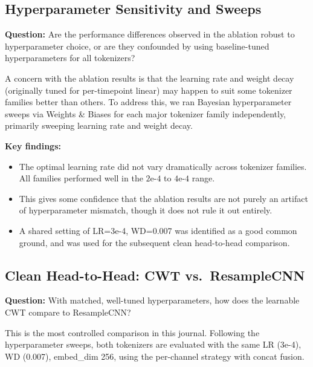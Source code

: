 \documentclass[11pt, a4paper]{article}
\begin{document}
\subsection{Hyperparameter Sensitivity and Sweeps}
\label{sec:hp-sweeps}

\textbf{Question:} Are the performance differences observed in the
ablation robust to hyperparameter choice, or are they confounded by
using baseline-tuned hyperparameters for all tokenizers?

A concern with the ablation results is that the learning rate and
weight decay (originally tuned for per-timepoint linear) may happen to
suit some tokenizer families better than others. To address this, we ran
Bayesian hyperparameter sweeps via Weights \& Biases for each major
tokenizer family independently, primarily sweeping learning rate and
weight decay.

\textbf{Key findings:}
\begin{itemize}[nosep]
      \item The optimal learning rate did not vary dramatically across
            tokenizer families. All families performed well in the
            $2\text{e-4}$ to $4\text{e-4}$ range.
      \item This gives some confidence that the ablation results are not
            purely an artifact of hyperparameter mismatch, though it does
            not rule it out entirely.
      \item A shared setting of LR=3e-4, WD=0.007 was identified as a
            good common ground, and was used for the subsequent clean
            head-to-head comparison.
\end{itemize}


\subsection{Clean Head-to-Head: CWT vs.\ ResampleCNN}
\label{sec:cwt-vs-cnn}

\textbf{Question:} With matched, well-tuned hyperparameters, how does
the learnable CWT compare to ResampleCNN?

This is the most controlled comparison in this journal. Following the
hyperparameter sweeps, both tokenizers are evaluated with the same
LR (3e-4), WD (0.007), embed\_dim 256, using the per-channel strategy
with concat fusion.
\end{document}
